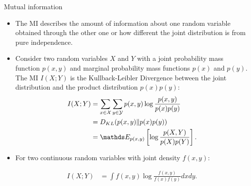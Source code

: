 \documentclass[11pt,compress,t,notes=noshow, xcolor=table]{beamer}
\begin{document}
\begin{vbframe} {Mutual information}

% 

\begin{itemize}
\item The MI describes the amount of information about one random variable obtained through the other one or how different the joint distribution is from pure independence.
\item Consider two random variables $X$ and $Y$ with a joint probability mass function $p(x, y)$ and marginal probability mass functions $p(x)$ and $p(y)$. The MI $I (X;Y)$ is the Kullback-Leibler Divergence between the joint distribution and the product distribution $p(x)p(y)$:
\footnotesize
\begin{equation*}\begin{aligned}
I(X ; Y) &=\sum_{x \in \Xspace} \sum_{y \in \Yspace} p(x, y) \log \frac{p(x, y)}{p(x) p(y)} \\
&=D_{KL}(p(x, y) \| p(x) p(y)) \\
&=\E_{p(x, y)} \left[ \log \frac{p(X, Y)}{p(X) p(Y)} \right].
\end{aligned}\end{equation*}
\normalsize

\item For two continuous random variables with joint density $f(x,y)$:

\footnotesize
\begin{equation*}\begin{aligned}
I(X ; Y) &= \int f(x,y) \log \frac{f(x,y)}{f(x)f(y)} dx dy.
\end{aligned}
\end{equation*}
\normalsize

\end{itemize}

\end{vbframe}
\end{document}
